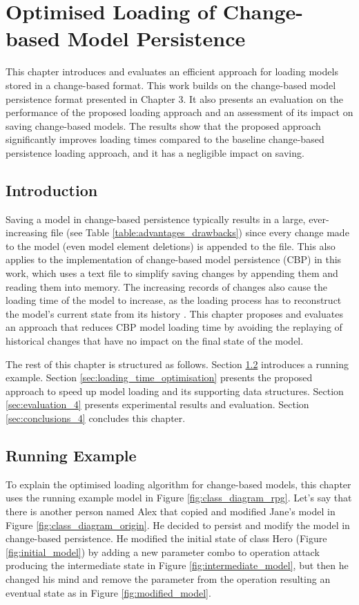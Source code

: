 \chapter{Optimised Loading of Change-based Model Persistence}
\label{ch:optimised_loading}

This chapter introduces and evaluates an efficient approach for loading models stored in a change-based format. This work builds on the change-based model persistence format presented in Chapter 3. It also presents an evaluation on the performance of the proposed loading approach and an assessment of its impact on saving change-based models. The results show that the proposed approach significantly improves loading times compared to the baseline change-based persistence loading approach, and it has a negligible impact on saving.

\section{Introduction}
\label{sec:introduction_4}
Saving a model in change-based persistence typically results in a large, ever-increasing file (see Table \ref{table:advantages_drawbacks}) since every change made to the model (even model element deletions) is appended to the file. This also applies to the implementation of change-based model persistence (CBP) in this work, which uses a text file to simplify saving changes by appending them and reading them into memory. The increasing records of changes also cause the loading time of the model to increase, as the loading process has to reconstruct the model’s current state from its history \cite{DBLP:conf/models/YohannisKP17}. This chapter proposes and evaluates an approach that reduces CBP model loading time by avoiding the replaying of historical changes that have no impact on the final state of the model.

The rest of this chapter is structured as follows. Section \ref{sec:case_study} introduces a running example.
Section \ref{sec:loading_time_optimisation} presents the proposed approach to speed up model loading and its supporting data structures. Section \ref{sec:evaluation_4} presents experimental results and evaluation. Section \ref{sec:conclusions_4} concludes this chapter.

\section{Running Example}
\label{sec:case_study}
To explain the optimised loading algorithm for change-based models, this chapter uses the running example model in Figure \ref{fig:class_diagram_rpg}.
Let's say that there is another person named Alex that copied and modified Jane's model in Figure \ref{fig:class_diagram_origin}. He decided to persist and modify the model in change-based persistence. He modified the initial state of class Hero (Figure \ref{fig:initial_model}) by adding a new parameter \textsf{combo} to operation \textsf{attack} producing the intermediate state in Figure \ref{fig:intermediate_model}, but then he changed his mind and remove the parameter from the operation resulting an eventual state as in Figure \ref{fig:modified_model}.

